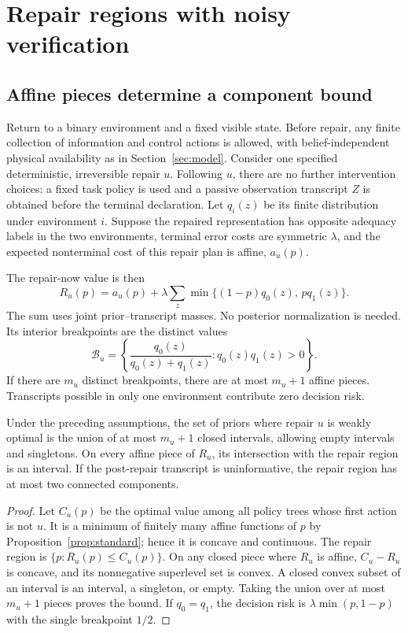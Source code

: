 \section{Repair regions with noisy verification}
\label{sec:geometry}
\subsection{Affine pieces determine a component bound}
Return to a binary environment and a fixed visible state. Before repair, any
finite collection of information and control actions is allowed, with
belief-independent physical availability as in Section~\ref{sec:model}.
Consider one specified deterministic, irreversible repair $u$. Following $u$,
there are no further intervention choices: a fixed task policy is used and a
passive observation transcript $Z$ is obtained before the terminal declaration.
Let $q_i(z)$ be its finite distribution under environment $i$. Suppose the
repaired representation has opposite adequacy labels in the two environments,
terminal error costs are symmetric $\lambda$, and the expected nonterminal
cost of this repair plan is affine, $a_u(p)$.

The repair-now value is then
\begin{equation}
R_u(p)=a_u(p)+\lambda\sum_z\min\{(1-p)q_0(z),\,p q_1(z)\}.
\label{eq:repairrisk}
\end{equation}
The sum uses joint prior--transcript masses. No posterior normalization is
needed. Its interior breakpoints are the distinct values
\begin{equation}
\mathcal B_u=
\left\{\frac{q_0(z)}{q_0(z)+q_1(z)}:
q_0(z)q_1(z)>0\right\}.
\end{equation}
If there are $m_u$ distinct breakpoints, there are at most $m_u+1$ affine pieces.
Transcripts possible in only one environment contribute zero decision risk.

\begin{theorem}
\label{thm:geometry}
Under the preceding assumptions, the set of priors where repair $u$ is weakly
optimal is the union of at most $m_u+1$ closed intervals, allowing empty intervals
and singletons. On every affine piece of $R_u$, its intersection with the repair
region is an interval. If the post-repair transcript is uninformative, the
repair region has at most two connected components.
\end{theorem}
\begin{proof}
Let $C_u(p)$ be the optimal value among all policy trees whose first action is
not $u$. It is a minimum of finitely many affine functions of $p$ by
Proposition~\ref{prop:standard}; hence it is concave and continuous.
The repair region is $\{p:R_u(p)\le C_u(p)\}$. On any closed piece where $R_u$
is affine, $C_u-R_u$ is concave, and its nonnegative superlevel set is convex.
A closed convex subset of an interval is an interval, a singleton, or empty.
Taking the union over at most $m_u+1$ pieces proves the bound. If $q_0=q_1$,
the decision risk is $\lambda\min(p,1-p)$ with the single breakpoint $1/2$.
\end{proof}

